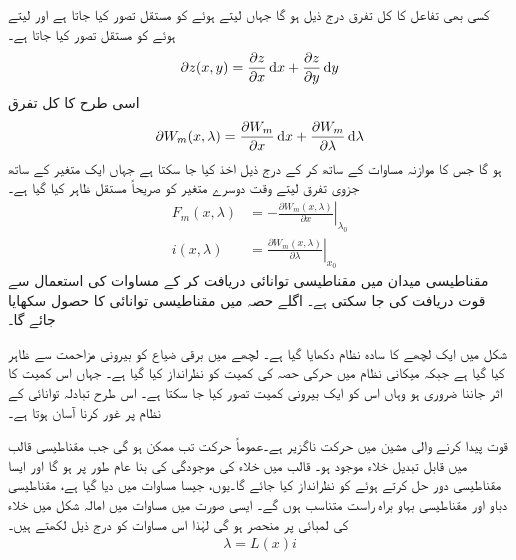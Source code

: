 کسی بھی تفاعل  کا کل تفرق درج ذیل ہو گا جہاں  لیتے ہوئے  کو مستقل تصور کیا جاتا ہے اور  لیتے ہوئے  کو مستقل تصور کیا جاتا ہے۔
\begin{align}\label{مساوات_تبادلہ_جزوی_تفرق_عمومی_الف}
\partial z(x,y)=\frac{\partial z}{\partial x} \dif x+\frac{\partial z}{\partial y} \dif y
\end{align}
اسی طرح  کا کل تفرق
\begin{align}\label{مساوات_تبادلہ_جزوی_تفرق_عمومی_ب}
\partial W_m(x,\lambda)=\frac{\partial W_m}{\partial x}\dif x+\frac{\partial W_m}{\partial \lambda}\dif \lambda
\end{align}
ہو گا جس کا موازنہ مساوات  کے ساتھ کر کے درج ذیل اخذ  کیا جا سکتا ہے جہاں ایک متغیر کے ساتھ جزوی تفرق لیتے وقت دوسرے متغیر  کو صریحاً مستقل ظاہر کیا گیا ہے۔
\begin{align}
F_m(x,\lambda)&=-\left. \frac{\partial W_m(x,\lambda)}{\partial x}\right|_{\lambda_0}\label{مساوات_تبادلہ_توانائی_قوت_برقی_رو}\\
i(x,\lambda)&=\left. \frac{\partial W_m(x,\lambda)}{\partial \lambda}\right|_{x_0}\label{مساوات_تبادلہ_توانائی_سے_رو}
\end{align}
مقناطیسی میدان میں مقناطیسی توانائی  دریافت کر کے مساوات   کی  استعمال سے قوت  دریافت کی جا سکتی ہے۔ اگلے حصہ میں مقناطیسی توانائی کا حصول سکھایا جائے گا۔

شکل   میں  ایک لچھے کا سادہ نظام دکھایا گیا ہے۔ لچھے میں برقی ضیاع کو بیرونی مزاحمت سے ظاہر کیا گیا ہے جبکہ میکانی نظام میں حرکی حصہ کی کمیت کو نظرانداز کیا گیا ہے۔ جہاں اس کمیت  کا اثر جاننا ضروری ہو وہاں  اس کو ایک بیرونی کمیت تصور کیا جا سکتا ہے۔ اس طرح تبادلہ توانائی کے نظام پر غور کرنا آسان ہوتا ہے۔ 

قوت پیدا کرنے والی مشین میں حرکت ناگزیر ہے۔عموماً حرکت تب ممکن ہو گی جب مقناطیسی قالب میں قابل تبدیل خلاء موجود ہو۔ قالب میں خلاء کی موجودگی کی بنا عام طور  پر  ہو گا اور ایسا  مقناطیسی دور حل کرتے ہوئے  کو نظرانداز کیا جائے گا۔یوں، جیسا مساوات   میں دیا گیا ہے،  مقناطیسی دباو  اور مقناطیسی بہاو   براہ راست متناسب ہوں گے۔ ایسی صورت میں مساوات   میں  امالہ  شکل    میں خلاء کی لمبائی   پر منحصر ہو گی لہٰذا اس مساوات کو درج ذیل لکھتے ہیں۔
\begin{align}\label{مساوات_تبادلہ_ارتباط_بہاو_اور_امالہ}
\lambda=L(x) i
\end{align}

